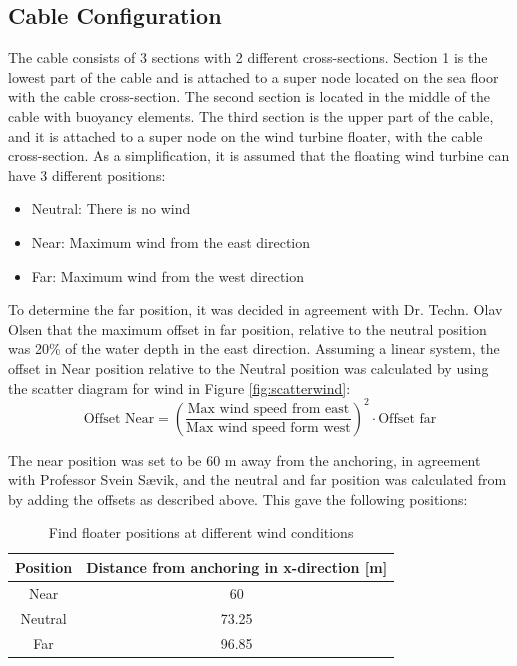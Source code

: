 \subsection{Cable Configuration}
The cable consists of 3 sections with 2 different cross-sections. Section 1 is the lowest part of the cable and is attached to a super node located on the sea floor with the cable cross-section. The second section is located in the middle of the cable with buoyancy elements. The third section is the upper part of the cable, and it is attached to a super node on the wind turbine floater, with the cable cross-section.\newline
\newline 
\noindent As a simplification, it is assumed that the floating wind turbine can have 3 different positions:
\begin{itemize}
    \item Neutral: There is no wind
    \item Near: Maximum wind from the east direction
    \item Far: Maximum wind from the west direction
\end{itemize}
To determine the far position, it was decided in agreement with Dr. Techn. Olav Olsen that the maximum offset in far position, relative to the neutral position was 20\% of the water depth in the east direction. Assuming a linear system, the offset in Near position relative to the Neutral position was calculated by using the scatter diagram for wind in Figure \ref{fig:scatterwind}:
\begin{equation}
    \text{Offset Near}=\left(\frac{\text{Max  wind speed from east}}{\text{Max wind speed form west}}\right)^2 \cdot \text{Offset far}
\end{equation}

\noindent The near position was set to be 60 m away from the anchoring, in agreement with Professor Svein Sævik, and the neutral and far position was calculated from by adding the offsets as described above. This gave the following positions: 
\begin{table} [H]
\centering
\begin{tabular}{ |c|c|}
\hline
Position & Distance from anchoring in x-direction [m] \\
 \hline
 \hline
 
Near & 60\\

Neutral & 73.25\\

Far & 96.85 \\
 
 \hline
\end{tabular}
\caption{Find floater positions at different wind conditions}
\label{table:pos}
\end{table}

